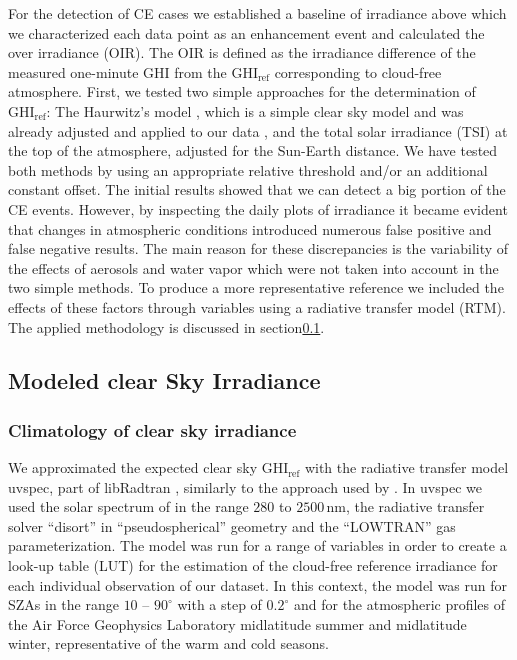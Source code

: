 \documentclass[preprint, 5p,
authoryear]{elsarticle} %
\begin{document}
For the detection of CE cases we established a baseline of irradiance
above which we characterized each data point as an enhancement event and
calculated the over irradiance (OIR). The OIR is defined as the
irradiance difference of the measured one-minute GHI from the
\(\text{GHI}_\text{ref}\) corresponding to cloud-free atmosphere. First,
we tested two simple approaches for the determination of
\(\text{GHI}_\text{ref}\): The Haurwitz's model \citep{Haurwitz1945},
which is a simple clear sky model and was already adjusted and applied
to our data \citep{Natsis2023}, and the total solar irradiance (TSI) at
the top of the atmosphere, adjusted for the Sun-Earth distance. We have
tested both methods by using an appropriate relative threshold and/or an
additional constant offset. The initial results showed that we can
detect a big portion of the CE events. However, by inspecting the daily
plots of irradiance it became evident that changes in atmospheric
conditions introduced numerous false positive and false negative
results. The main reason for these discrepancies is the variability of
the effects of aerosols and water vapor which were not taken into
account in the two simple methods. To produce a more representative
reference we included the effects of these factors through variables
using a radiative transfer model (RTM). The applied methodology is
discussed in section\nobreakspace{}\ref{rtmcs}.

\subsection{Modeled clear Sky Irradiance}\label{rtmcs}

\subsubsection{Climatology of clear sky
irradiance}\label{climatology-of-clear-sky-irradiance}

We approximated the expected clear sky \(\text{GHI}_\text{ref}\) with
the radiative transfer model uvspec, part of libRadtran
\citep{Emde2016}, similarly to the approach used by
\citet{Vamvakas2020}. In uvspec we used the solar spectrum of
\citet{Kurucz1994} in the range \(280\) to \(2500\,\text{nm}\), the
radiative transfer solver ``disort'' in ``pseudospherical'' geometry and
the ``LOWTRAN'' gas parameterization. The model was run for a range of
variables in order to create a look-up table (LUT) for the estimation of
the cloud-free reference irradiance for each individual observation of
our dataset. In this context, the model was run for SZAs in the range
\(10\) -- \(90^\circ\) with a step of \(0.2^\circ\) and for the
atmospheric profiles of the Air Force Geophysics Laboratory
\citep{Anderson1986} midlatitude summer and midlatitude winter,
representative of the warm and cold seasons.
\end{document}
